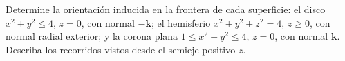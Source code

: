 ﻿Determine la orientación inducida en la frontera de cada superficie: el disco $x^2+y^2\leq4$, $z=0$, con normal $-\mathbf k$; el hemisferio $x^2+y^2+z^2=4$, $z\geq0$, con normal radial exterior; y la corona plana $1\leq x^2+y^2\leq4$, $z=0$, con normal $\mathbf k$. Describa los recorridos vistos desde el semieje positivo $z$.
